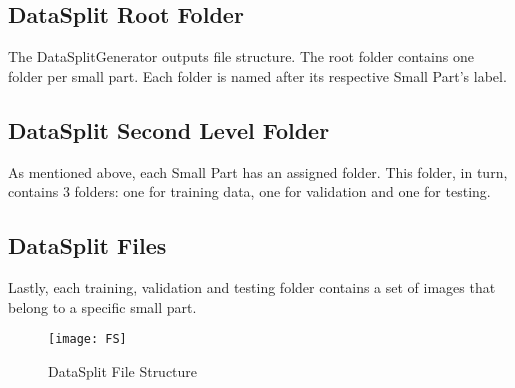 \subsection{DataSplit Root Folder}
The DataSplitGenerator outputs file structure. The root folder contains one folder per small part. Each folder is named after its respective Small Part's label.

\subsection{DataSplit Second Level Folder}
As mentioned above, each Small Part has an assigned folder. This folder, in turn, contains 3 folders: one for training data, one for validation and one for testing.

\subsection{DataSplit Files}
Lastly, each training, validation and testing folder contains a set of images that belong to a specific small part.


\begin{figure}[h]
\centering
  \texttt{[image: FS]}
\caption{DataSplit File Structure}
\label{fig:FS}
\end{figure}
